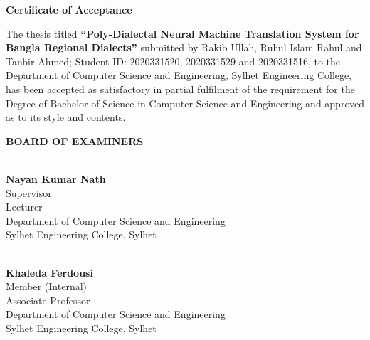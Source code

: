 \documentclass[12pt,a4paper]{article}
\begin{document}
\newpage
\thispagestyle{empty}
\begin{center}
    \Large \textbf{Certificate of Acceptance}
\end{center}
\vspace{1cm}

The thesis titled \textbf{``Poly-Dialectal Neural Machine Translation System for Bangla Regional Dialects''} submitted by Rakib Ullah, Ruhul Islam Rahul and Tanbir Ahmed; Student ID: 2020331520, 2020331529 and 2020331516, to the Department of Computer Science and Engineering, Sylhet Engineering College, has been accepted as satisfactory in partial fulfilment of the requirement for the Degree of Bachelor of Science in Computer Science and Engineering and approved as to its style and contents.

\vspace{1.5cm}

\begin{center}
    \textbf{BOARD OF EXAMINERS}
\end{center}

\vspace{1.5cm}

\noindent
\begin{minipage}[t]{0.45\textwidth}
    \noindent\makebox[2.5in]{\hrulefill} \\
    \textbf{Nayan Kumar Nath} \\
    Supervisor \\
    Lecturer \\
    Department of Computer Science and Engineering \\
    Sylhet Engineering College, Sylhet
\end{minipage}
\hfill
\begin{minipage}[t]{0.45\textwidth}
    \noindent\makebox[2.5in]{\hrulefill} \\
    \textbf{Khaleda Ferdousi} \\
    Member (Internal) \\
    Associate Professor \\
    Department of Computer Science and Engineering \\
    Sylhet Engineering College, Sylhet
\end{minipage}

\vspace{1.8cm}
\end{document}
